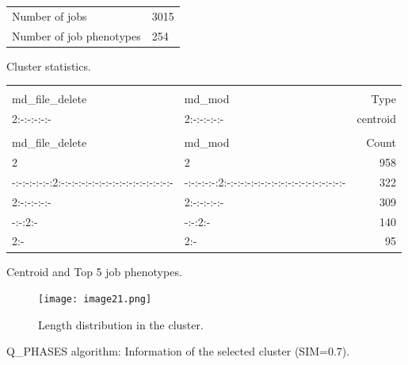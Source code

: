\documentclass{jhps}
\begin{document}
\begin{figure}
	\begin{subtable}{\textwidth}
	 \centering
	 \begin{tabular}{ll}
		 Number of jobs & 3015 \\
		 Number of job phenotypes & 254 \\
	 \end{tabular}
	 \caption{Cluster statistics.}
	 \label{cluster:pm_quant:stats}
	\end{subtable}
	\medskip
	\begin{subtable}{\textwidth}
	 \centering
	 \begin{tiny}
     \begin{tabular}{ll|r}
       \rowcolor{tblhead}
       \multicolumn{2}{l|}{Q-coding} &              \\
       \rowcolor{tblhead}
       md\_file\_delete                                & md\_mod                                          & Type    \\ 
       \hline
       2:-:-:-:-:-                                     & 2:-:-:-:-:-                                      & centroid \\ 
       \multicolumn{3}{l}{}              \\
       \rowcolor{tblhead}
       \hline
       md\_file\_delete                                & md\_mod                                          & Count    \\ 
       2                                               & 2                                                & 958      \\ 
       -:-:-:-:-:-:2:-:-:-:-:-:-:-:-:-:-:-:-:-:-:-:-:- & -:-:-:-:-:2:-:-:-:-:-:-:-:-:-:-:-:-:-:-:-:-:-:-  & 322      \\ 
       2:-:-:-:-:-                                     & 2:-:-:-:-:-                                      & 309      \\ 
       -:-:2:-                                         & -:-:2:-                                          & 140      \\ 
       2:-                                             & 2:-                                              & 95       \\ 
     \end{tabular}
	 \end{tiny}
	 \caption{Centroid and Top 5 job phenotypes.}
	 \label{cluster:pm_quant:top_jobs}
	\end{subtable}
	\medskip
	\begin{subfigure}{\textwidth}
		\centering
		\texttt{[image: image21.png]}
		\caption{Length distribution in the cluster.}
		\label{cluster:pm_quant:length}
	\end{subfigure}
	\caption{Q\_PHASES algorithm: Information of the selected cluster (SIM=0.7).}
	\label{cluster:pm_quant}
\end{figure}
\end{document}
